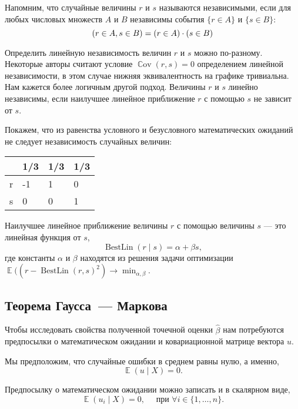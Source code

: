 \documentclass[12pt]{article}
\DeclareMathOperator{\Cov}{\mathbb{C}ov}
\DeclareMathOperator{\BestLin}{BestLin}
\let\P\relax
\DeclareMathOperator{\P}{\mathbb{P}}
\DeclareMathOperator{\E}{\mathbb{E}}
\newcommand{\hb}{\hat{\beta}}
\renewcommand{\u}{u}
\begin{document}
Напомним, что случайные величины $r$ и $s$ называются независимыми, если 
для любых числовых множеств $A$ и $B$ независимы события $\{r \in A\}$ и $\{s \in B\}$:
\[
\P(r \in A, s \in B) = \P(r \in A) \cdot \P(s \in B)
\]

Определить линейную независимость величин $r$ и $s$ можно по-разному. 
Некоторые авторы считают условие $\Cov(r, s) = 0$ определением линейной независимости, в этом случае нижняя эквивалентность на графике тривиальна. 
Нам кажется более логичным другой подход.
Величины $r$ и $s$ линейно независимы, если 
наилучшее линейное приближение $r$ с помощью $s$ не зависит от $s$.

\begin{problem}
    Покажем, что из равенства условного и безусловного математических ожиданий не следует независимость случайных величин:  
    
    \begin{tabular}{|l|l|l|l|}
    \hline
      & 1/3 & 1/3 & 1/3 \\ \hline
    r & -1  & 1   & 0   \\ \hline
    s & 0   & 0   & 1   \\ \hline
    \end{tabular}  
\end{problem}

    

\begin{definition}
Наилучшее линейное приближение величины $r$ с помощью величины $s$ — это линейная функция от $s$,
\[
\BestLin(r \mid s) = \alpha + \beta s,
\]
где константы $\alpha$ и $\beta$ находятся из решения задачи оптимизации
$\E((r - \BestLin(r, s)^2) \to \min_{\alpha, \beta}$.
    
\end{definition}


\subsection{Теорема Гаусса~--- Маркова}

Чтобы исследовать свойства полученной точечной оценки $\hb$ нам потребуются предпосылки о математическом ожидании и ковариационной матрице вектора $\u$.

Мы предположим, что случайные ошибки в среднем равны нулю, а именно,
\[
\E(\u \mid X) = 0.
\]

Предпосылку о математическом ожидании можно записать и в скалярном виде,
\[
\E(\u_i \mid X) = 0, \quad \text{ при } \forall i \in \{1, \dots, n\}.
\]
\end{document}
